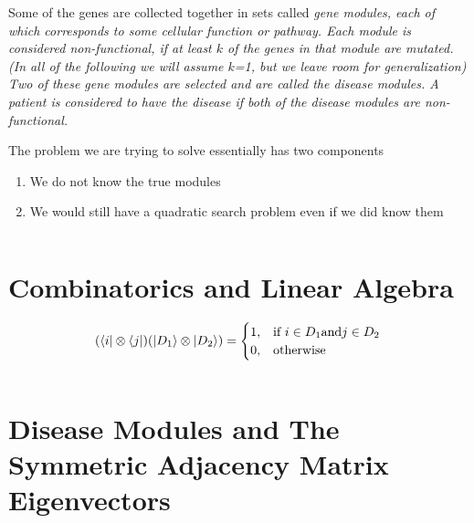 \documentclass[a4paper,english]{article}
\begin{document}
Some of the genes are collected together in sets called  \em{gene modules}, each of which corresponds to some cellular function or pathway. 
Each module is considered \em{non-functional}, if at least $k$ of the genes in that module are mutated. (In all of the following we will assume $k$=1,
 but we leave room for generalization)  
 Two of these gene modules are selected and are called the disease modules.
  A patient is considered to \em{have the disease} if both of the disease modules are non-functional.%



The problem we are trying to solve essentially has two components %

\begin{enumerate}
    \item We do not know the true modules
    \item We would still have a quadratic search problem even if we did know them
\end{enumerate}

$$ $$


\section{Combinatorics and Linear Algebra}

$$ (\bra{i} \otimes \bra{j}) (\ket{D_1} \otimes \ket{D_2}) = 
\begin{cases}
    1,              & \text{if } i \in  D_1 \text{and}  j \in D_2\\
    0,              & \text{otherwise}
\end{cases}
 $$



%
%

%

$$ $$

\section{Disease Modules and The Symmetric Adjacency Matrix Eigenvectors}
\end{document}
